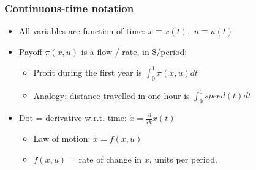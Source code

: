 \documentclass[bigger,handout]{beamer}
\begin{document}
\begin{frame}%
\frametitle{Continuous-time notation}

\begin{itemize}
\item All variables are function of time: $x\equiv x\left( t\right) ,$ $%
u\equiv u\left( t\right) $

\item Payoff $\pi \left( x,u\right) $ is a flow / rate, in \$/period:

\begin{itemize}
\item Profit during the first year is $\int_{0}^{1}\pi \left( x,u\right) dt$

\item Analogy: distance travelled in one hour is $\int_{0}^{1}speed\left(
t\right) dt$
\end{itemize}

\item Dot = derivative w.r.t. time: $\dot{x}=\frac{\partial }{\partial t}%
x\left( t\right) $

\begin{itemize}
\item Law of motion: $\dot{x}=f(x,u)$

\item $f(x,u)$ = rate of change in $x$, units per period.
\end{itemize}
\end{itemize}

\end{frame}%
\end{document}
